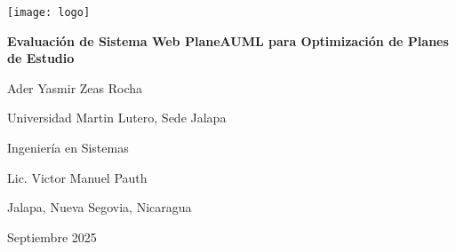 \begin{titlepage}
     \par
    \vspace{0.5in}
    \centering
    \singlespacing

    \texttt{[image: logo]}
    \vspace{0.5in}

    \textbf{Evaluación de Sistema Web PlaneAUML para Optimización de Planes de Estudio} \par

    \vspace{1.5in}

    Ader Yasmir Zeas Rocha \par

    \vspace{0.5\baselineskip}

    Universidad Martin Lutero, Sede Jalapa \par

    \vspace{0.5\baselineskip}

    Ingeniería en Sistemas \par

    \vspace{0.5\baselineskip}

    Lic. Victor Manuel Pauth \par

    \vspace{0.5\baselineskip}

    Jalapa, Nueva Segovia, Nicaragua \par

    \vspace{0.5\baselineskip}

    Septiembre 2025 \par

\end{titlepage}